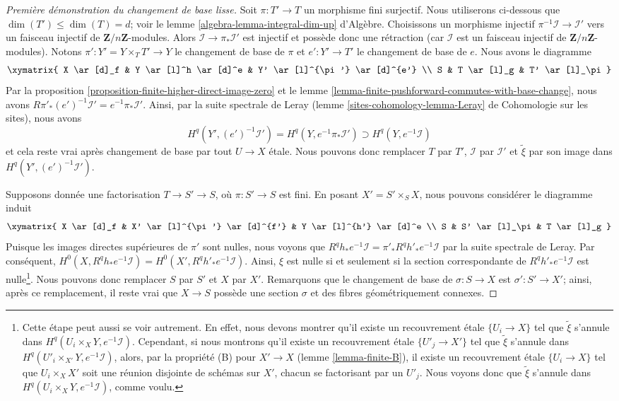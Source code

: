 \begin{proof}[Première démonstration du changement de base lisse]
\medskip\noindent
Soit $\pi : T' \to T$ un morphisme fini surjectif.
Nous utiliserons ci-dessous que $\dim(T') \leq \dim(T) = d$; voir le
lemme \ref{algebra-lemma-integral-dim-up} d'Algèbre.
Choisissons un morphisme injectif $\pi^{-1}\mathcal{I} \to \mathcal{I}'$
vers un faisceau injectif de $\mathbf{Z}/n\mathbf{Z}$-modules.
Alors $\mathcal{I} \to \pi_*\mathcal{I}'$ est injectif
et possède donc une rétraction (car $\mathcal{I}$ est un faisceau injectif
de $\mathbf{Z}/n\mathbf{Z}$-modules).
Notons $\pi' : Y' = Y \times_T T' \to Y$ le changement de base de $\pi$
et $e' : Y' \to T'$ le changement de base de $e$. Nous avons le diagramme
$$
\xymatrix{
X \ar[d]_f & Y \ar[l]^h \ar[d]^e & Y' \ar[l]^{\pi'} \ar[d]^{e'} \\
S & T \ar[l]_g & T' \ar[l]_\pi
}
$$
Par la proposition \ref{proposition-finite-higher-direct-image-zero} et le
lemme \ref{lemma-finite-pushforward-commutes-with-base-change}, nous avons
$R\pi'_*(e')^{-1}\mathcal{I}' = e^{-1}\pi_*\mathcal{I}'$.
Ainsi, par la suite spectrale de Leray
(lemme \ref{sites-cohomology-lemma-Leray} de Cohomologie sur les sites),
nous avons
$$
H^q(Y', (e')^{-1}\mathcal{I}') =
H^q(Y, e^{-1}\pi_*\mathcal{I}') \supset H^q(Y, e^{-1}\mathcal{I})
$$
et cela reste vrai après changement de base par tout $U \to X$ étale.
Nous pouvons donc remplacer $T$ par $T'$, $\mathcal{I}$ par $\mathcal{I}'$
et $\tilde \xi$ par son image dans $H^q(Y', (e')^{-1}\mathcal{I}')$.

\medskip\noindent
Supposons donnée une factorisation $T \to S' \to S$, où
$\pi : S' \to S$ est fini.
En posant $X' = S' \times_S X$, nous pouvons considérer le diagramme induit
$$
\xymatrix{
X \ar[d]_f & X' \ar[l]^{\pi'} \ar[d]^{f'} & Y \ar[l]^{h'} \ar[d]^e \\
S & S' \ar[l]_\pi & T \ar[l]_g
}
$$
Puisque les images directes supérieures de $\pi'$ sont nulles, nous voyons que
$R^qh_*e^{-1}\mathcal{I} = \pi'_*R^qh'_*e^{-1}\mathcal{I}$
par la suite spectrale de Leray. Par conséquent,
$H^0(X, R^qh_*e^{-1}\mathcal{I}) = H^0(X', R^qh'_*e^{-1}\mathcal{I})$.
Ainsi, $\xi$ est nulle si et seulement si la section correspondante de
$R^qh'_*e^{-1}\mathcal{I}$ est nulle\footnote{Cette
étape peut aussi se voir autrement. En effet, nous devons montrer
qu'il existe un recouvrement étale $\{U_i \to X\}$ tel que
$\tilde \xi$ s'annule dans $H^q(U_i \times_X Y, e^{-1}\mathcal{I})$.
Cependant, si nous montrons qu'il existe un recouvrement étale
$\{U'_j \to X'\}$ tel que $\tilde \xi$ s'annule dans
$H^q(U'_i \times_{X'} Y, e^{-1}\mathcal{I})$, alors, par la propriété (B)
pour $X' \to X$ (lemme \ref{lemma-finite-B}), il existe un recouvrement étale
$\{U_i \to X\}$ tel que $U_i \times_X X'$ soit une réunion disjointe
de schémas sur $X'$, chacun se factorisant par un $U'_j$.
Nous voyons donc que $\tilde \xi$ s'annule dans $H^q(U_i \times_X Y, e^{-1}\mathcal{I})$,
comme voulu.}.
Nous pouvons donc remplacer $S$ par $S'$ et $X$ par $X'$.
Remarquons que le changement de base de $\sigma : S \to X$ est $\sigma' : S' \to X'$;
ainsi, après ce remplacement, il reste vrai que $X \to S$
possède une section $\sigma$ et des fibres géométriquement connexes.


\end{proof}
